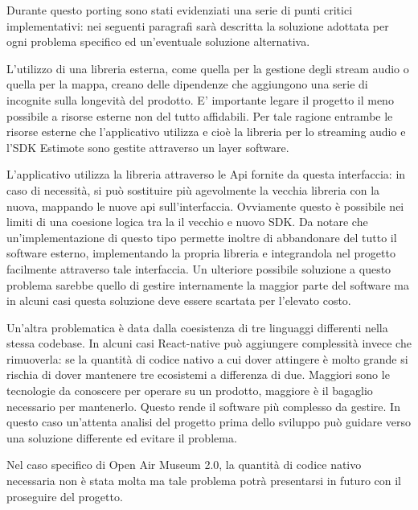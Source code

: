 Durante questo porting sono stati evidenziati una serie di punti critici implementativi: nei seguenti paragrafi sarà descritta la soluzione adottata per ogni problema specifico ed un'eventuale soluzione alternativa.\vspace{5mm}

L’utilizzo di una libreria esterna, come quella per la gestione degli stream audio o quella per la mappa, creano delle dipendenze che aggiungono una serie di incognite sulla longevità del prodotto. E’ importante legare il progetto il meno possibile a risorse esterne non del tutto affidabili. Per tale ragione entrambe le risorse esterne che l’applicativo utilizza e cioè la libreria per lo streaming audio e l’SDK Estimote sono gestite attraverso un layer software.\vspace{5mm}

 L’applicativo utilizza la libreria attraverso le Api fornite da questa interfaccia: in caso di necessità, si può sostituire più agevolmente la vecchia libreria con la nuova, mappando le nuove api sull’interfaccia. Ovviamente questo è possibile nei limiti di una coesione logica tra la il vecchio e nuovo SDK. Da notare che un'implementazione di questo tipo permette inoltre di abbandonare del tutto il software esterno, implementando la propria libreria e integrandola nel progetto facilmente attraverso tale interfaccia. Un ulteriore possibile soluzione a questo problema sarebbe quello di gestire internamente la maggior parte del software ma in alcuni casi questa soluzione deve essere scartata per l’elevato costo.\vspace{5mm}

Un'altra problematica è data dalla coesistenza di tre linguaggi differenti nella stessa codebase. In alcuni casi React-native può aggiungere complessità invece che rimuoverla: se la quantità di codice nativo a cui dover attingere è molto grande si rischia di dover mantenere tre ecosistemi a differenza di due. Maggiori sono le tecnologie da conoscere per operare su un prodotto, maggiore è il bagaglio necessario per mantenerlo. Questo rende il software più complesso da gestire. In questo caso un'attenta analisi del progetto prima dello sviluppo può guidare verso una soluzione differente ed evitare il problema.\vspace{5mm}

 Nel caso specifico di Open Air Museum 2.0, la quantità di codice nativo necessaria non è stata molta ma tale problema potrà presentarsi in futuro con il proseguire del progetto.\vspace{5mm}


